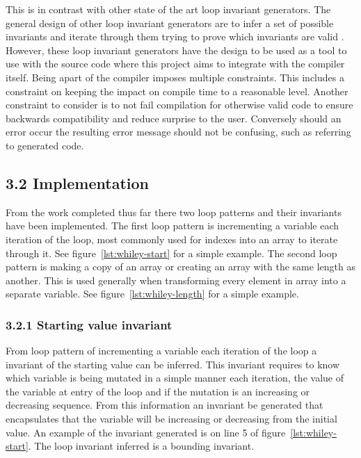 \documentclass[11pt, a4paper, twoside, openright]{report}
\begin{document}
This is in contrast with other state of the art loop invariant generators.
The general design of other loop invariant generators are to infer a set
of possible invariants and iterate through them trying to prove which
invariants are valid \cite{infer-dynamic} \cite{infer-postconditions}.
However, these loop invariant generators have the design to be used as a tool
to use with the source code where this project aims to integrate with the
compiler itself. Being apart of the compiler imposes multiple constraints.
This includes a constraint on keeping the impact on compile time to a
reasonable level.
Another constraint to consider is to not fail compilation for otherwise valid
code to ensure backwards compatibility and reduce surprise to the user.
Conversely should an error occur the resulting error message should not be
confusing, such as referring to generated code.

\subsection*{3.2 Implementation}


From the work completed thus far there two loop patterns and their invariants
have been implemented. The first loop pattern is incrementing a variable
each iteration of the loop, most commonly used for indexes into an array to
iterate through it. See figure~\ref{lst:whiley-start} for a simple example.
The second loop pattern is making a copy of an array or creating an array with
the same length as another.
This is used generally when transforming every element in array into a separate
variable. See figure~\ref{lst:whiley-length} for a simple example.

\subsubsection*{3.2.1 Starting value invariant}

From loop pattern of incrementing a variable each iteration of the loop
a invariant of the starting value can be inferred.
This invariant requires to know which variable is being
mutated in a simple manner each iteration,
the value of the variable at entry of the loop and if the mutation is an
increasing or decreasing sequence.
From this information an invariant be generated that encapsulates that the
variable will be increasing or decreasing from the initial value.
An example of the invariant generated is on line 5 of
figure~\ref{lst:whiley-start}.
The loop invariant inferred is a bounding invariant.
\end{document}
